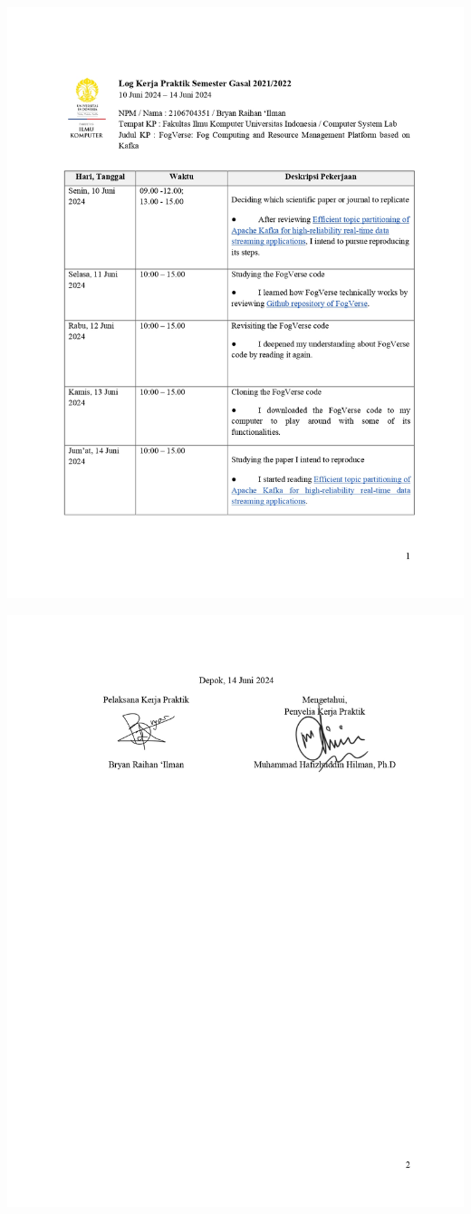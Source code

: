 \includegraphics[width=1\textwidth]{assets/pics/Log-2-CSL-Bryan Raihan Ilman-0001.jpg}

\includegraphics[width=1\textwidth]{assets/pics/Log-2-CSL-Bryan Raihan Ilman-0002.jpg}

